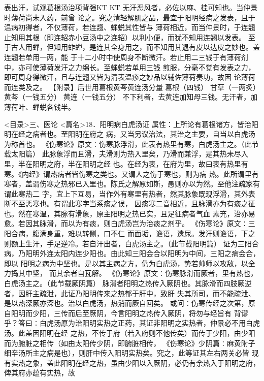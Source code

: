\documentclass[a4paper,12pt,UTF8,twoside]{ctexbook}
\begin{document}
表出汗，试观葛根汤治项背强KT KT 无汗恶风者，必佐以麻、桂可知也。当仲景时薄荷尚未入药，前曾 
论之。究之清轻解肌之品，最宜于阳明经病之发表，且于温病初得者，不仅薄荷，若连翘、蝉蜕其性皆与 
薄荷相近，而当仲景时，于连翘止知用其根（即连轺赤小豆汤中之连轺）以利小便，而犹不知用连翘以发表。 
至于古人用蝉，但知用蚱蝉，是连其全身用之，而不知用其退有皮以达皮之妙也。盖连翘若单用一两，能 
于十二小时中使周身不断微汗。若止用二三钱于有薄荷剂中，亦可使薄荷发汗之力绵长。至蝉蜕若单用三钱 
煎服，分毫不觉有发表之力，即可周身得微汗，且与连翘又皆为清表温疹之妙品以辅佐薄荷奏功，故因 
论薄荷而连类及之。 
【附录】后世用葛根黄芩黄连汤分量 
葛根（四钱） 甘草（一两炙） 黄芩（一钱五分） 黄连（一钱五分） 
不下利者，去黄连加知母三钱。无汗者，加薄荷叶、蝉蜕各钱半。 

<目录>三、医论
<篇名>18．阳明病白虎汤证
属性：上所论有葛根诸方，皆治阳明在经之病者也。至阳明在府之 
病，又当另议治法，其治之主要，自当以白虎汤为称首也。 
《伤寒论》原文∶伤寒脉浮滑，此表有热里有寒，白虎汤主之。（此节载太阳篇） 
此脉象浮而且滑，夫滑则为热入里矣，乃滑而兼浮，是其热未尽入里，半在阳明之府，半在阳明之经 
也。在经为表，在府为里，故曰表有热里有寒。《内经》谓热病者皆伤寒之类也。又谓人之伤于寒也，则为病 
热。此所谓里有寒者，盖谓伤寒之热邪已入里也。陈氏之解原如斯，愚则亦以为然。至他注疏家有谓此寒热二 
字，宜上下互易，当作外有寒里有热者，然其脉象既现浮滑，其外表断不至恶寒也。有谓此寒字当系痰之误， 
因痰寒二音相近，且脉滑亦为有痰之征也。然在寒温，其脉有滑象，原主阳明之热已实，且足征病者气血 
素充，治亦易愈。若因其脉滑，而以为有痰，则白虎汤岂为治痰之剂乎。 
《伤寒论》原文∶三阳合病，腹满身重，难以转侧，口不仁 
而面垢，谵语，遗尿。发汗则谵语，下之则额上生汗，手足逆冷。若自汗出者，白虎汤主之。（此节载阳明篇） 
证为三阳合病，乃阳明外连太阳内连少阳也。由此知三阳会合以阳明为中间，三阳之病会合，即以 
阳明之病为中坚也。是以其主病之方，仍为白虎汤，势若帅师以攻敌，以全力捣其中坚， 
而其余者自瓦解。 
《伤寒论》原文∶伤寒脉滑而厥者，里有热也，白虎汤主之。（此节载厥阴篇） 
脉滑者阳明之热传入厥阴也。其脉滑而四肢厥逆者，因肝主疏泄，此证乃阳明传来之热郁于肝中，致肝 
失其所司，而不能疏泄、是以热深厥亦深也。治以白虎汤，热消而厥自回矣。 
或问∶伤寒传经之次第，原自阳明而少阳，三传而后至厥阴，今言阳明之热传入厥阴，将勿与经旨有 
背谬乎？答曰∶白虎汤原为治阳明实热之正药，其证非阳明之实热者，仲景必不用白虎汤。此盖因阳明在经 
之热，不传于府（若入府则不他传矣）而传于少阳，由少阳而为腑脏之相传（如由太阳传少阴，即腑脏相传， 
《伤寒论》少阴篇∶麻黄附子细辛汤所主之病是也），则肝中传入阳明实热矣。究之，此等证其左右两关必皆 
现有实热之象，盖此阳明在经之热，虽由少阳以入厥阴，必仍有余热入于阳明之府，俾其府亦蕴有实热，故 
\end{document}
